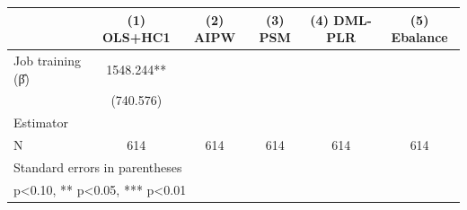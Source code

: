 \begin{table}[htbp]
\centering
\begin{tabular}{lccccc}
\hline\hline
 & (1) OLS+HC1 & (2) AIPW & (3) PSM & (4) DML-PLR & (5) Ebalance \\
\hline
Job training (β̂) & 1548.244** &  &  &  &  \\
 & (740.576) &  &  &  &  \\
\hline
Estimator &  &  &  &  &  \\
N & 614 & 614 & 614 & 614 & 614 \\
\hline\hline
\multicolumn{6}{l}{\footnotesize Standard errors in parentheses} \\
\multicolumn{6}{l}{\footnotesize * p<0.10, ** p<0.05, *** p<0.01} \\
\end{tabular}
\end{table}